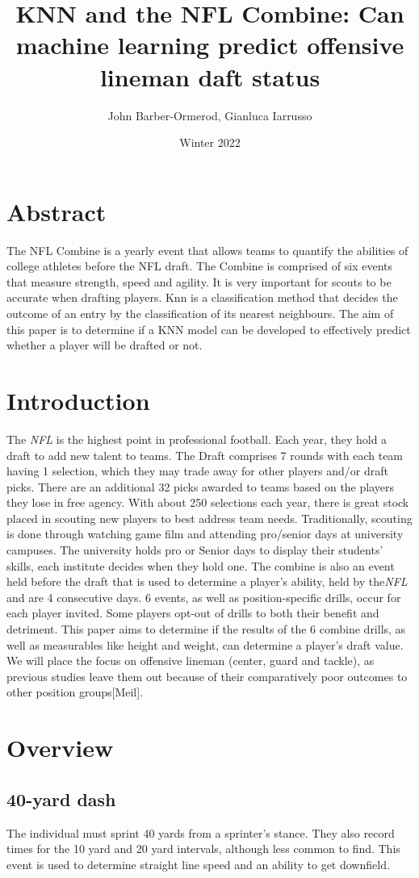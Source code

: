 \documentclass[confrence]{IEEEtran}
\title{KNN and the NFL Combine\texttrademark: Can machine learning predict offensive lineman daft status}
\author{John Barber-Ormerod, Gianluca Iarrusso}
\date{Winter 2022}
\begin{document}
\maketitle
\section*{Abstract}
The NFL Combine is a yearly event that allows teams to quantify the abilities of college athletes before the NFL draft. 
The Combine is comprised of six events that measure strength, speed and agility.
It is very important for scouts to be accurate when drafting players.
Knn is a classification method that decides the outcome of an entry by the classification of its nearest neighbours. 
The aim of this paper is to determine if a KNN model can be developed to effectively predict whether a player will be drafted or not.
\section*{Introduction}
The \textit{NFL} is the highest point in professional football. Each year, they hold a draft to add new talent to teams.
The Draft comprises 7 rounds with each team having 1 selection,
which they may trade away for other players and/or draft picks.
There are an additional 32 picks awarded to teams based on the players they lose in free agency.
With about 250 selections each year, there is great stock placed in scouting new players to best address team needs.
Traditionally, scouting is done through watching game film and attending pro/senior days at university campuses.
The university holds pro or Senior days to display their students' skills, each institute decides when they hold one.
The combine is also an event held before the draft that is used to determine a player's ability, held by the\textit{NFL} and are 4 consecutive days.
6 events, as well as position-specific drills, occur for each player invited.
Some players opt-out of drills to both their benefit and detriment.
This paper aims to determine if the results of the 6 combine drills, as well as measurables like height and weight, can determine a player's draft value.
We will place the focus on offensive lineman (center, guard and tackle), as previous studies leave them out because of their comparatively poor outcomes to other position groups[Meil].
\section*{Overview}
\subsection*{40-yard dash}
The individual must sprint 40 yards from a sprinter's stance. They also record times for the 10 yard and 20 yard intervals, although less common to find.
This event is used to determine straight line speed and an ability to get downfield.
\end{document}
